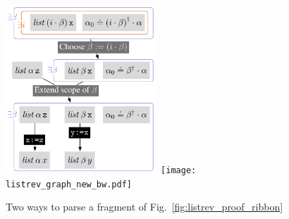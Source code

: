 \documentclass[runningheads,a4paper]{llncs}
\begin{document}
\begin{figure}[tp]
{\begin{minipage}{57mm}
\includegraphics[width=57mm]{listrev_graph_new.pdf}
\else
\texttt{[image: listrev\_graph\_new\_bw.pdf]}
\fi
\hspace{-2mm}
\label{fig:listrev_graph}
\end{minipage}
}
\caption{Two ways to parse a fragment of Fig.~\ref{fig:listrev_proof_ribbon}}
\end{figure}
\end{document}
